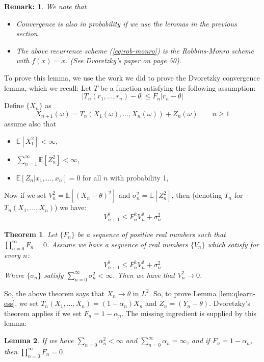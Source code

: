 \documentclass{article}
\def\E{\mathbb{E}}
\newtheorem{theorem}{Theorem}
\newtheorem{lemma}[theorem]{Lemma}
\newtheorem*{remark}{Remark:}
\begin{document}
\begin{remark}
We note that
\begin{itemize}
    \item Convergence is also in probability if we use the lemmas in the previous section.
    \item The above recurrence scheme (\ref{eq:rob-monro}) is the Robbins-Monro scheme with $f(x) = x$. (See Dvoretzky's paper on page 50).
\end{itemize} 
\end{remark}

To prove this lemma, we use the work we did to prove the Dvoretzky convergence lemma, which we recall:
Let $T$ be a function satisfying the following assumption:
\[ 
|T_n(r_1,\dots,r_n) - \theta| \le F_n | r_n - \theta |
\]
Define $\{X_n\}$ as
\[
X_{n+1}(\omega) = T_n(X_1(\omega),\dots,X_n(\omega)) + Z_n(\omega) \qquad n \ge 1 
\]
assume also that
\begin{itemize}
    \item $\mathbb{E}[X_1^2] < \infty$,
    \item $\sum_{n=1}^{\infty}\E[Z_n^2] < \infty$,
    \item $\E[Z_n | x_1,\dots,x_n] = 0$ for all $n$ with probability 1,
\end{itemize}

Now if we set $V_n^2 = \E\left[ (X_n - \theta)^2\right]$ and $\sigma_n^2 = \E\left[ Z_n^2 \right]$, then (denoting $T_n$ for $T_n(X_1,\dots,X_n)$) we have:
\[ V_{n+1}^2 \le F_n^2 V_n^2 + \sigma_n^2\]

\begin{theorem}
Let $\{F_n\}$ be a sequence of positive real numbers such that $\prod_{n=0}^\infty F_n =0$. Assume we have a sequence of real numbers $\{V_n\}$ which satisfy for every $n$:
\[ 
    V_{n+1}^2 \le F_n^2 V_n^2 + \sigma_n^2
\]
Where $\{\sigma_n\}$ satisfy $\sum_{n=0}^\infty \sigma_n^2 < \infty$. Then we have that $V_n^2 \rightarrow 0$.
\end{theorem}

So, the above theorem says that $X_n \to \theta$ in $L^2$. 
So, to prove Lemma \ref{lem:qlearn-ess}, we set $T_n(X_1,\dots,X_n) = (1-\alpha_n)X_n$ and $Z_n = (Y_n - \theta)$.
Dvoretzky's theorem applies if we set $F_n = 1 - \alpha_n$. The missing ingredient is supplied by this lemma:
\begin{lemma}
If we have $\sum_{n=0}\alpha_n^2 < \infty$ and $\sum_{n=0}^\infty \alpha_n = \infty$, and if $F_n = 1 - \alpha_n$, then $\prod_{n=0}^\infty F_n = 0$. 
\end{lemma}
\end{document}
